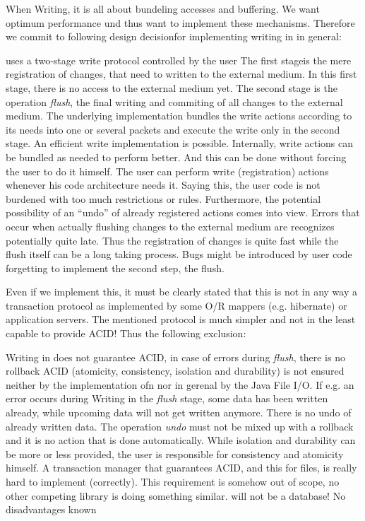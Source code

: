 When Writing, it is all about bundeling accesses and buffering. We want optimum performance und thus want to implement these mechanisms. Therefore we commit to following design decisionfor implementing writing in \LibName{} in general:

{%
\COMPmedia{} uses a two-stage write protocol controlled by the user
}
{%
The first stageis the mere registration of changes, that need to written to the external medium. In this first stage, there is no access to the external medium yet. The second stage is the operation \emph{flush}, the final writing and commiting of all changes to the external medium. The underlying implementation bundles the write actions according to its needs into one or several packets and execute the write only in the second stage.
}
{%
An efficient write implementation is possible. Internally, write actions can be bundled as needed to perform better. And this can be done without forcing the user to do it himself. The user can perform write (registration) actions whenever his code architecture needs it. Saying this, the user code is not burdened with too much restrictions or rules. Furthermore, the potential possibility of an ``undo'' of already registered actions comes into view.
}
{%
Errors that occur when actually flushing changes to the external medium are recognizes potentially quite late. Thus the registration of changes is quite fast while the flush itself can be a long taking process. Bugs might be introduced by user code forgetting to implement the second step, the flush.
}

Even if we implement this, it must be clearly stated that this is not in any way a transaction protocol as implemented by some O/R mappers (e.g. hibernate) or application servers. The mentioned protocol is much simpler and not in the least capable to provide ACID! Thus the following exclusion:

{%
Writing in \COMPmedia{} does not guarantee ACID, in case of errors during \emph{flush}, there is no rollback
}
{%
ACID (atomicity, consistency, isolation and durability) is not ensured neither by the implementation ofn \COMPmedia{} nor in gerenal by the Java File I/O. If e.g. an error occurs during Writing in the \emph{flush} stage, some data has been written already, while upcoming data will not get written anymore. There is no undo of already written data. The operation \emph{undo} must not be mixed up with a rollback and it is no action that is done automatically. While isolation and durability can be more or less provided, the user is responsible for consistency and atomicity himself.
}
{%
A transaction manager that guarantees ACID, and this for files, is really hard to implement (correctly). This requirement is somehow out of scope, no other competing library is doing something similar. \LibName{} will not be a database!
}
{%
No disadvantages known
}


